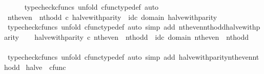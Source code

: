 \begin{isabellebody}
\ \ \ \ \isamarkupfalse%
\ {\isacharparenleft}{\kern0pt}typecheck{\isacharunderscore}{\kern0pt}cfuncs{\isacharcomma}{\kern0pt}\ unfold\ cfunc{\isacharunderscore}{\kern0pt}type{\isacharunderscore}{\kern0pt}def{\isacharcomma}{\kern0pt}\ auto{\isacharparenright}{\kern0pt}\isanewline
\ \ \isamarkupfalse%
\ {\isachardoublequoteopen}nth{\isacharunderscore}{\kern0pt}even\ {\isasymamalg}\ nth{\isacharunderscore}{\kern0pt}odd\ {\isasymcirc}\isactrlsub c\ halve{\isacharunderscore}{\kern0pt}with{\isacharunderscore}{\kern0pt}parity\ {\isacharequal}{\kern0pt}\ id\isactrlsub c\ {\isacharparenleft}{\kern0pt}domain\ halve{\isacharunderscore}{\kern0pt}with{\isacharunderscore}{\kern0pt}parity{\isacharparenright}{\kern0pt}{\isachardoublequoteclose}\isanewline
\ \ \ \ \isamarkupfalse%
\ {\isacharparenleft}{\kern0pt}typecheck{\isacharunderscore}{\kern0pt}cfuncs{\isacharcomma}{\kern0pt}\ unfold\ cfunc{\isacharunderscore}{\kern0pt}type{\isacharunderscore}{\kern0pt}def{\isacharcomma}{\kern0pt}\ auto\ simp\ add{\isacharcolon}{\kern0pt}\ nth{\isacharunderscore}{\kern0pt}even{\isacharunderscore}{\kern0pt}nth{\isacharunderscore}{\kern0pt}odd{\isacharunderscore}{\kern0pt}halve{\isacharunderscore}{\kern0pt}with{\isacharunderscore}{\kern0pt}parity{\isacharparenright}{\kern0pt}\isanewline
\ \ \isamarkupfalse%
\ {\isachardoublequoteopen}halve{\isacharunderscore}{\kern0pt}with{\isacharunderscore}{\kern0pt}parity\ {\isasymcirc}\isactrlsub c\ nth{\isacharunderscore}{\kern0pt}even\ {\isasymamalg}\ nth{\isacharunderscore}{\kern0pt}odd\ {\isacharequal}{\kern0pt}\ id\isactrlsub c\ {\isacharparenleft}{\kern0pt}domain\ {\isacharparenleft}{\kern0pt}nth{\isacharunderscore}{\kern0pt}even\ {\isasymamalg}\ nth{\isacharunderscore}{\kern0pt}odd{\isacharparenright}{\kern0pt}{\isacharparenright}{\kern0pt}{\isachardoublequoteclose}\isanewline
\ \ \ \ \isamarkupfalse%
\ {\isacharparenleft}{\kern0pt}typecheck{\isacharunderscore}{\kern0pt}cfuncs{\isacharcomma}{\kern0pt}\ unfold\ cfunc{\isacharunderscore}{\kern0pt}type{\isacharunderscore}{\kern0pt}def{\isacharcomma}{\kern0pt}\ auto\ simp\ add{\isacharcolon}{\kern0pt}\ halve{\isacharunderscore}{\kern0pt}with{\isacharunderscore}{\kern0pt}parity{\isacharunderscore}{\kern0pt}nth{\isacharunderscore}{\kern0pt}even{\isacharunderscore}{\kern0pt}nth{\isacharunderscore}{\kern0pt}odd{\isacharparenright}{\kern0pt}\isanewline
{}\isamarkupfalse%
%
\endisatagproof
{\isafoldproof}%
%
\isadelimproof
\isanewline
%
\endisadelimproof
\isanewline
{}\isamarkupfalse%
\ halve\ {\isacharcolon}{\kern0pt}{\isacharcolon}{\kern0pt}\ {\isachardoublequoteopen}cfunc{\isachardoublequoteclose}\ \isanewline

\end{isabellebody}
